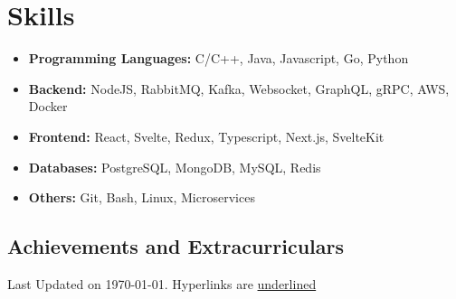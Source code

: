 \documentclass[11pt,a4paper,calibri]{moderncv}        %
\begin{document}
	\section{Skills}
	
	\begin{itemize}[leftmargin=.2in]
		\setlength\itemsep{.2em}
		
		\item \textbf{Programming Languages:} C/C++, Java, Javascript, Go, Python
            \vspace{-4pt}
		\item \textbf{Backend:} NodeJS, RabbitMQ, Kafka, Websocket, GraphQL, gRPC, AWS, Docker
		\vspace{-4pt}
		\item \textbf{Frontend:} React, Svelte, Redux, Typescript, Next.js, SvelteKit
		\vspace{-4pt}
		\item \textbf{Databases:} PostgreSQL, MongoDB, MySQL, Redis
		\vspace{-4pt}
		\item \textbf{Others:} Git, Bash, Linux, Microservices
            
		
	\end{itemize}

	\subsection{Achievements and Extracurriculars}
	
		
	
	
	\vfill
	\textnormal{\footnotesize Last Updated on \today. Hyperlinks are \underline{underlined}}
	
%	
	
\end{document}
